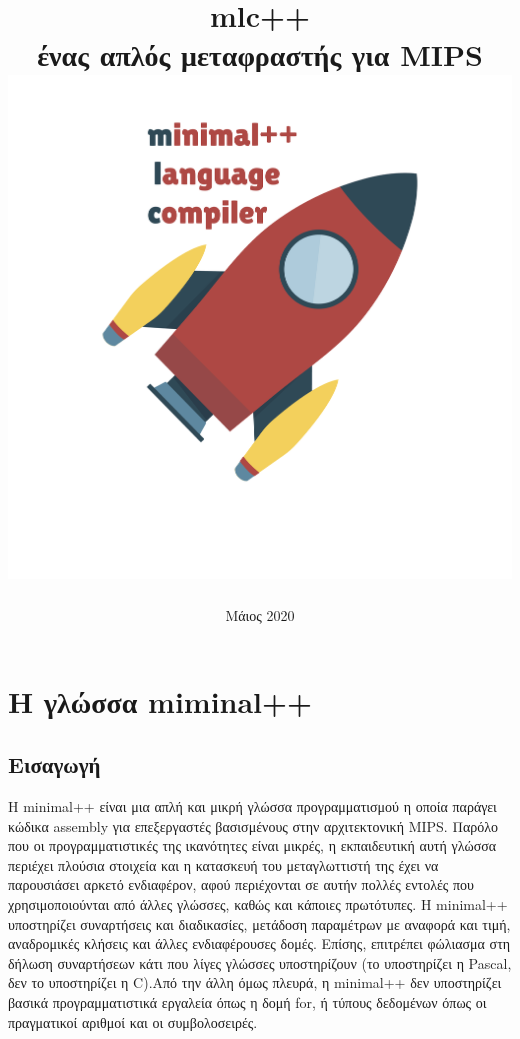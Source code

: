 \documentclass[12pt,a4paper,a4paper]{report}
\begin{document}
\title{mlc++\\ ένας απλός μεταφραστής για MIPS \\ \includegraphics[scale=0.3]{logo}}
\date{Μάιος 2020}
\maketitle

\tableofcontents

\chapter{Η γλώσσα miminal++}

\section{Εισαγωγή}
Η minimal++ είναι μια απλή και μικρή γλώσσα προγραμματισμού η οποία παράγει κώδικα assembly για επεξεργαστές βασισμένους στην αρχιτεκτονική MIPS. Παρόλο που οι προγραμματιστικές της ικανότητες είναι μικρές, η εκπαιδευτική αυτή γλώσσα περιέχει πλούσια στοιχεία και η κατασκευή του μεταγλωττιστή της έχει να παρουσιάσει αρκετό ενδιαφέρον, αφού περιέχονται σε αυτήν πολλές εντολές που χρησιμοποιούνται από άλλες γλώσσες, καθώς και κάποιες πρωτότυπες. Η minimal++ υποστηρίζει συναρτήσεις και διαδικασίες, μετάδοση   παραμέτρων με αναφορά και τιμή, αναδρομικές κλήσεις και άλλες ενδιαφέρουσες δομές. Επίσης, επιτρέπει φώλιασμα στη δήλωση συναρτήσεων κάτι που λίγες γλώσσες υποστηρίζουν (το υποστηρίζει η Pascal, δεν το υποστηρίζει η C).Από την άλλη όμως πλευρά, η minimal++ δεν υποστηρίζει βασικά προγραμματιστικά εργαλεία όπως η δομή for, ή τύπους δεδομένων όπως οι πραγματικοί αριθμοί και οι συμβολοσειρές.
\end{document}
